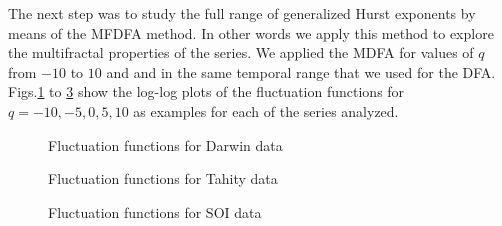 \documentclass[onecolumn, preprint,aps,amsmath, amssymb, superscriptaddress]{revtex4}
\begin{document}
The next step was to study the full range of generalized Hurst exponents by means of the MFDFA method. In other words we apply this method to explore the multifractal properties of the series. We applied the MDFA for values of $q$ from $-10$ to $10$ and and in the same temporal range that we used for the DFA. Figs.\ref{fig:mfdfa_dar} to \ref{fig:mfdfa_soi} show the log-log plots of the fluctuation functions for $q=-10,-5,0,5,10$ as examples for each of the series analyzed.

\begin{figure}
\caption{Fluctuation functions for Darwin data}
\label{fig:mfdfa_dar}
\end{figure}

\begin{figure}
\caption{Fluctuation functions for Tahity data}
\label{fig:mfdfa_tah}
\end{figure}

\begin{figure}
\caption{Fluctuation functions for SOI data}
\label{fig:mfdfa_soi}
\end{figure}
\end{document}
